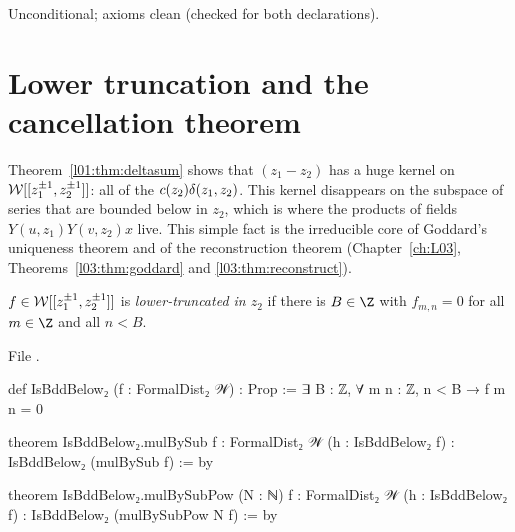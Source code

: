 \begin{status}
Unconditional; axioms clean (checked for both declarations).
\end{status}

\section{Lower truncation and the cancellation theorem}\label{l01:sec:truncation}

Theorem~\ref{l01:thm:deltasum} shows that $(z_1-z_2)$ has a huge kernel on $\mathcal{W}[[z_1^{\pm1},z_2^{\pm1}]]$: all of the
$c(z_2)\delta(z_1,z_2)$. This kernel disappears on the subspace of series that are bounded below in $z_2$, which is
where the products of fields $Y(u,z_1)Y(v,z_2)x$ live. This simple fact is the irreducible core of Goddard's
uniqueness theorem and of the reconstruction theorem (Chapter~\ref{ch:L03},
Theorems~\ref{l03:thm:goddard} and \ref{l03:thm:reconstruct}).

\begin{definition}\label{l01:def:bddbelow}
$f\in\mathcal{W}[[z_1^{\pm1},z_2^{\pm1}]]$ is \emph{lower-truncated in $z_2$} if there is $B\in\Z$ with $f_{m,n} = 0$ for all
$m\in\Z$ and all $n<B$.
\end{definition}

\noindent File .
\begin{leancode}
def IsBddBelow₂ (f : FormalDist₂ 𝒲) : Prop := ∃ B : ℤ, ∀ m n : ℤ, n < B → f m n = 0

theorem IsBddBelow₂.mulBySub {f : FormalDist₂ 𝒲} (h : IsBddBelow₂ f) :
    IsBddBelow₂ (mulBySub f) := by

theorem IsBddBelow₂.mulBySubPow (N : ℕ) {f : FormalDist₂ 𝒲} (h : IsBddBelow₂ f) :
    IsBddBelow₂ (mulBySubPow N f) := by
\end{leancode}

